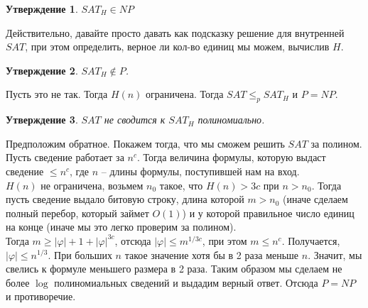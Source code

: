 \documentclass[12pt, letterpaper]{article}
\newtheorem{prop}{Утверждение}[section]
\newcommand{\ph}{\varphi}
\newcommand{\leqp}{\leq_{p}}
\begin{document}
\begin{prop}
$SAT_H \in NP$
\end{prop}
Действительно, давайте просто давать как подсказку решение для внутренней $SAT$, при этом определить, верное ли кол-во единиц мы можем, вычислив $H$.

\begin{prop}
$SAT_H \notin P$. 
\end{prop}
Пусть это не так. Тогда $H(n)$ ограничена. Тогда $SAT \leqp SAT_H$ и $P=NP$.

\begin{prop}
$SAT$ не сводится к $SAT_H$ полиномиально.
\end{prop}
Предположим обратное. Покажем тогда, что мы сможем решить $SAT$ за полином. Пусть сведение работает за $n^c$. Тогда величина формулы, которую выдаст сведение $\leq n^c$, где $n$ -- длины формулы, поступившей нам на вход. \\
$H(n)$ не ограничена, возьмем $n_0$ такое, что $H(n) > 3c$ при $n > n_0$. Тогда пусть сведение выдало битовую строку, длина которой $m > n_0$ (иначе сделаем полный перебор, который займет $O(1)$) и у которой правильное число единиц на конце (иначе мы это легко проверим за полином).\\
Тогда $m \geq |\ph| + 1 + |\ph|^{3c}$, отсюда $|\ph| \leq m^{1/3c}$, при этом $m \leq n^c$. Получается, $|\ph| \leq n^{1/3}$. При больших $n$ такое значение хотя бы в 2 раза меньше $n$. Значит, мы свелись к формуле меньшего размера в 2 раза. Таким образом мы сделаем не более $\log$ полиномиальных сведений и выдадим верный ответ. Отсюда $P = NP$ и противоречие.
\end{document}
